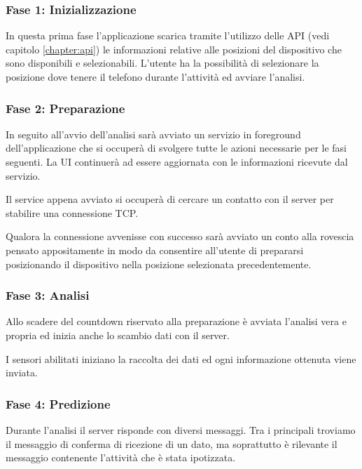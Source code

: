 \subsubsection{Fase 1: Inizializzazione}
In questa prima fase l'applicazione scarica tramite l'utilizzo delle API (vedi capitolo \ref{chapter:api}) le informazioni relative
alle posizioni del dispositivo che sono disponibili e selezionabili.
L'utente ha la possibilità di selezionare la posizione dove tenere il telefono durante l'attività ed avviare l'analisi.

\subsubsection{Fase 2: Preparazione}
In seguito all'avvio dell'analisi sarà avviato un servizio in foreground \cite{services} dell'applicazione che si occuperà di svolgere tutte le azioni 
necessarie per le fasi seguenti. La UI continuerà ad essere aggiornata con le informazioni ricevute dal servizio.

Il service appena avviato si occuperà di cercare un contatto con il server per stabilire una connessione TCP.

Qualora la connessione avvenisse con successo sarà avviato un conto alla rovescia pensato appositamente in modo da consentire all'utente 
di prepararsi posizionando il dispositivo nella posizione selezionata precedentemente.

\subsubsection{Fase 3: Analisi}
Allo scadere del countdown riservato alla preparazione è avviata l'analisi vera e propria ed inizia anche lo scambio dati con il server.

I sensori abilitati iniziano la raccolta dei dati ed ogni informazione ottenuta viene inviata.

\subsubsection{Fase 4: Predizione}
Durante l'analisi il server risponde con diversi messaggi. Tra i principali troviamo il messaggio di conferma di ricezione di un dato, 
ma soprattutto è rilevante il messaggio contenente l'attività che è stata ipotizzata.

